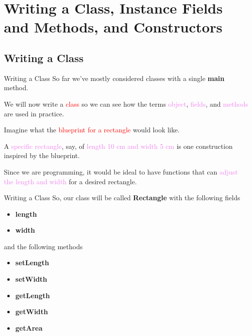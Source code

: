 \documentclass[11pt]{beamer}
\newcommand{\red}[1]{\textcolor{red}{#1}}
\newcommand{\violet}[1]{\textcolor{violet}{#1}}
\begin{document}
\section{Writing a Class, Instance Fields and Methods, and Constructors}
\subsection{Writing a Class}
\begin{frame}{Writing a Class}
    So far we've mostly considered classes with a single \textbf{main} method. \\ \vspace{1em}
    
    We will now write a \red{class} so we can see how the terms \violet{object}, \violet{fields}, and \violet{methods} are used in practice. \\ \vspace{1em}
    
    Imagine what the \red{blueprint for a rectangle} would look like. \\ \vspace{1em} 
    
    A \violet{specific rectangle}, say, of \violet{length 10 cm and width 5 cm} is one construction inspired by the blueprint. \\ \vspace{1em}
    
    Since we are programming, it would be ideal to have functions that can \violet{adjust the length and width} for a desired rectangle.
\end{frame}

\begin{frame}{Writing a Class}
    So, our class will be called \textbf{Rectangle} with the following fields
    \begin{itemize}
        \item \textbf{length}
        \item \textbf{width}
    \end{itemize}
    and the following methods
    \begin{itemize}
        \item \textbf{setLength}
        \item \textbf{setWidth}
        \item \textbf{getLength}
        \item \textbf{getWidth}
        \item \textbf{getArea}
    \end{itemize}
\end{frame}
\end{document}
